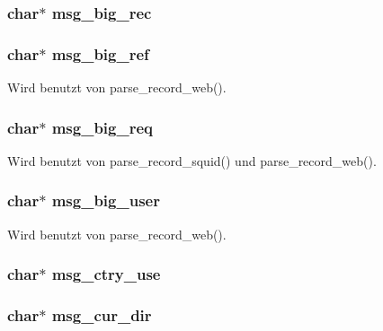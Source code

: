 \subsubsection{\setlength{\rightskip}{0pt plus 5cm}char$\ast$ {\bf msg\_\-big\_\-rec}}\label{lang_8h_1ef9a73473db9b45b770351a8c69ff33}


\subsubsection{\setlength{\rightskip}{0pt plus 5cm}char$\ast$ {\bf msg\_\-big\_\-ref}}\label{lang_8h_ae731a9fc075ed277c6ee4b8a6384ea0}




Wird benutzt von parse\_\-record\_\-web().
\subsubsection{\setlength{\rightskip}{0pt plus 5cm}char$\ast$ {\bf msg\_\-big\_\-req}}\label{lang_8h_43eab59f53dc27f4f768755b759684f7}




Wird benutzt von parse\_\-record\_\-squid() und parse\_\-record\_\-web().
\subsubsection{\setlength{\rightskip}{0pt plus 5cm}char$\ast$ {\bf msg\_\-big\_\-user}}\label{lang_8h_9f2cc97f2917013977b0b0969a5c7960}




Wird benutzt von parse\_\-record\_\-web().
\subsubsection{\setlength{\rightskip}{0pt plus 5cm}char$\ast$ {\bf msg\_\-ctry\_\-use}}\label{lang_8h_d86bfd951b9d1f489e0fac664d76643e}


\subsubsection{\setlength{\rightskip}{0pt plus 5cm}char$\ast$ {\bf msg\_\-cur\_\-dir}}\label{lang_8h_753780d6a71f07ea59ad96c3b4425d3f}


